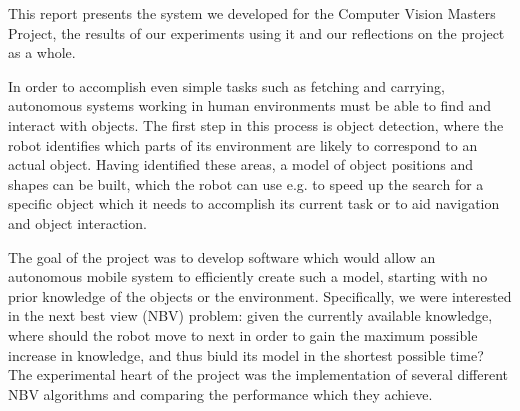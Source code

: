 

This report presents the system we developed for the Computer Vision Masters Project, the results of our experiments using it and our reflections on the project as a whole.

In order to accomplish even simple tasks such as fetching and carrying, autonomous systems working in human environments must be able to find and interact with objects.
The first step in this process is object detection, where the robot identifies which parts of its environment are likely to correspond to an actual object.
Having identified these areas, a model of object positions and shapes can be built, which the robot can use e.g. to speed up the search for a specific object which it needs to accomplish its current task or to aid navigation and object interaction.

The goal of the project was to develop software which would allow an autonomous mobile system to efficiently create such a model, starting with no prior knowledge of the objects or the environment.
Specifically, we were interested in the next best view (NBV) problem: given the currently available knowledge, where should the robot move to next in order to gain the maximum possible increase in knowledge, and thus biuld its model in the shortest possible time?
The experimental heart of the project was the implementation of several different NBV algorithms and comparing the performance which they achieve.



